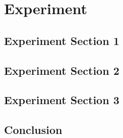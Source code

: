 %
\chapter{Experiment}
\label{sec:experiment}


\Blindtext[2][1]

\section{Experiment Section 1}
\label{sec:experiment:sec1}

\Blindtext[2][2]

\section{Experiment Section 2}
\label{sec:experiment:sec2}

\Blindtext[3][2]

\section{Experiment Section 3}
\label{sec:experiment:sec3}

\Blindtext[4][2]

\section{Conclusion}
\label{sec:experiment:conclusion}

\Blindtext[2][1]
